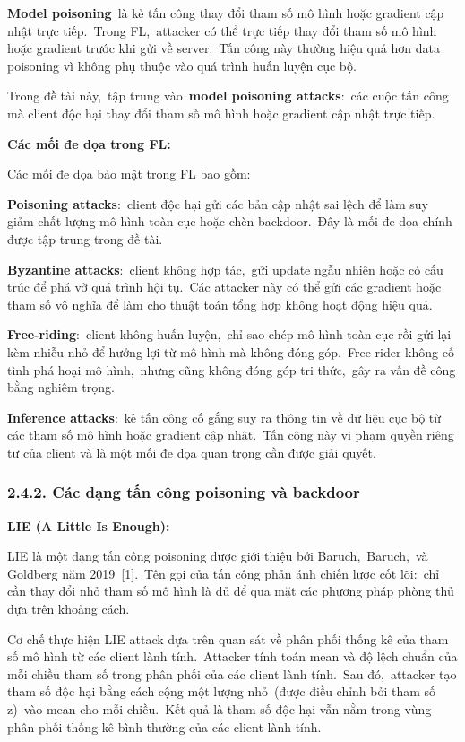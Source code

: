 \textbf{Model poisoning}~là kẻ tấn công thay đổi tham số mô hình hoặc gradient cập nhật trực tiếp.~Trong FL,~attacker có thể trực tiếp thay đổi tham số mô hình hoặc gradient trước khi gửi về server.~Tấn công này thường hiệu quả hơn data poisoning vì không phụ thuộc vào quá trình huấn luyện cục bộ.

Trong đề tài này,~tập trung vào~\textbf{model poisoning attacks}:~các cuộc tấn công mà client độc hại thay đổi tham số mô hình hoặc gradient cập nhật trực tiếp.

\textbf{Các mối đe dọa trong FL:}

Các mối đe dọa bảo mật trong FL bao gồm:

\textbf{Poisoning attacks}:~client độc hại gửi các bản cập nhật sai lệch để làm suy giảm chất lượng mô hình toàn cục hoặc chèn backdoor.~Đây là mối đe dọa chính được tập trung trong đề tài.

\textbf{Byzantine attacks}:~client không hợp tác,~gửi update ngẫu nhiên hoặc có cấu trúc để phá vỡ quá trình hội tụ.~Các attacker này có thể gửi các gradient hoặc tham số vô nghĩa để làm cho thuật toán tổng hợp không hoạt động hiệu quả.

\textbf{Free-riding}:~client không huấn luyện,~chỉ sao chép mô hình toàn cục rồi gửi lại kèm nhiễu nhỏ để hưởng lợi từ mô hình mà không đóng góp.~Free-rider không cố tình phá hoại mô hình,~nhưng cũng không đóng góp tri thức,~gây ra vấn đề công bằng nghiêm trọng.

\textbf{Inference attacks}:~kẻ tấn công cố gắng suy ra thông tin về dữ liệu cục bộ từ các tham số mô hình hoặc gradient cập nhật.~Tấn công này vi phạm quyền riêng tư của client và là một mối đe dọa quan trọng cần được giải quyết.

\subsubsection{2.4.2. Các dạng tấn công poisoning và backdoor}\label{cuxe1c-dux1ea1ng-tux1ea5n-cuxf4ng-poisoning-vuxe0-backdoor}

\textbf{LIE (A Little Is Enough):}

LIE là một dạng tấn công poisoning được giới thiệu bởi Baruch,~Baruch,~và Goldberg năm 2019~{[}1{]}.~Tên gọi của tấn công phản ánh chiến lược cốt lõi:~chỉ cần thay đổi nhỏ tham số mô hình là đủ để qua mặt các phương pháp phòng thủ dựa trên khoảng cách.

Cơ chế thực hiện LIE attack dựa trên quan sát về phân phối thống kê của tham số mô hình từ các client lành tính.~Attacker tính toán mean và độ lệch chuẩn của mỗi chiều tham số trong phân phối của các client lành tính.~Sau đó,~attacker tạo tham số độc hại bằng cách cộng một lượng nhỏ~(được điều chỉnh bởi tham số z)~vào mean cho mỗi chiều.~Kết quả là tham số độc hại vẫn nằm trong vùng phân phối thống kê bình thường của các client lành tính.

